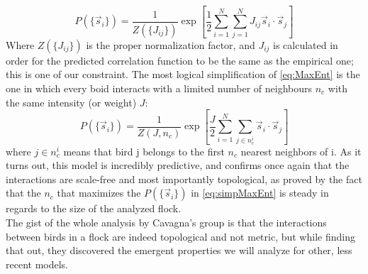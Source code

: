 \begin{equation}
    P(\{\vec{s}_i\}) = \frac{1}{Z(\{J_{ij}\})} \exp \left[ \frac{1}{2} \sum_{i=1}^{N} \sum_{j=1}^{N} J_{ij} \vec{s}_i \cdot \vec{s}_j \right]
    \label{eq:MaxEnt}
\end{equation}
Where $Z(\{J_{ij}\})$ is the proper normalization factor, and $J_{ij}$ is calculated in order for the predicted correlation function to be the same as the empirical one; this is one of our constraint. The most logical simplification of \autoref{eq:MaxEnt} is the one in which every boid interacts with a limited number of neighbours $n_c$ with the same intensity (or weight) $J$:
\begin{equation}
    P(\{\vec{s}_i\}) = \frac{1}{Z(J, n_c)} \exp \left[ \frac{J}{2} \sum_{i=1}^{N} \sum_{j \in n_c^i} \vec{s}_i \cdot \vec{s}_j \right]
    \label{eq:simpMaxEnt}
\end{equation}
where $j\in n_c^i$ means that bird j belongs to the first $n_c$ nearest neighbors of i. As it turns out, this model is incredibly predictive, and confirms once again that the interactions are scale-free and most importantly topological, as proved by the fact that the $n_c$ that maximizes the $P(\{\vec{s}_i\})$ in \autoref{eq:simpMaxEnt} is steady in regards to the size of the analyzed flock. \cite{cavagna_2012} \\
The gist of the whole analysis by Cavagna's group is that the  interactions between birds in a flock are indeed topological and not metric, but while finding that out, they discovered the emergent properties we will analyze for other, less recent models.

